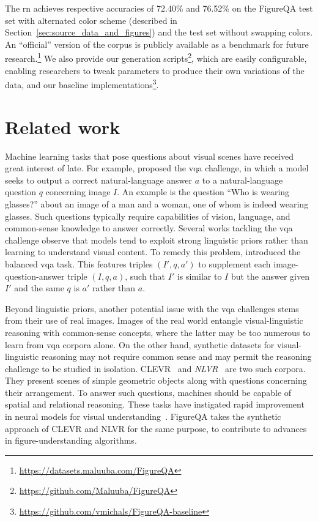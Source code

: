 \documentclass{article} \usepackage{iclr2018_workshop,times}
\def\bestrntestone{76.52} \def\bestrntesttwo{72.40} \def\bestcnntesttwo{56.00} \def\bestvggtesttwo{52.47} \def\besttexttesttwo{50.01} \def\besthumantesttwohuman{91.21} \def\bestcnntesttwohuman{56.04} \def\bestrntesttwohuman{72.18} \def\bestrnonevalone{67.95} \def\bestrnonevaltwo{60.60} \def\bestrnonetestone{67.74} \def\bestrnonetesttwo{60.35}
\begin{document}
The \gls{rn} achieves respective accuracies of \bestrntesttwo\% and \bestrntestone\% on the FigureQA test set with alternated color scheme (described in Section~\ref{sec:source_data_and_figures}) and the test set without swapping colors.
An ``official'' version of the corpus is publicly available as a benchmark for future research.\footnote{\url{https://datasets.maluuba.com/FigureQA}} 
We also provide our generation scripts\footnote{\url{https://github.com/Maluuba/FigureQA}}, which are easily configurable, enabling researchers to tweak parameters to produce their own variations of the data, and our baseline implementations\footnote{\url{https://github.com/vmichals/FigureQA-baseline}}.

\section{Related work}
\label{sec:related}
Machine learning tasks that pose questions about visual scenes have received great interest of late.
For example, \citet{antol2015vqa} proposed the \gls{vqa} challenge, in which a model seeks to output a correct natural-language answer $a$ to a natural-language question $q$ concerning image $I$.
An example is the question ``Who is wearing glasses?'' about an image of a man and a woman, one of whom is indeed wearing glasses.
Such questions typically require capabilities of vision, language, and common-sense knowledge to answer correctly.
Several works tackling the \gls{vqa} challenge observe
that models tend to exploit strong linguistic priors rather than learning
to understand visual content. To remedy this problem, \citet{goyal2016making} 
introduced the balanced \gls{vqa} task. This features
triples  $(I', q, a')$ to supplement each image-question-answer triple $(I, q, a)$, 
such that $I'$ is similar to $I$ but the answer given $I'$ and the 
same $q$ is $a'$ rather than $a$.

Beyond linguistic priors, another potential issue with the \gls{vqa} challenges stems from their use of real images.
Images of the real world entangle visual-linguistic reasoning with common-sense concepts,
where the latter may be too numerous to learn from \gls{vqa} corpora alone.
On the other hand, synthetic datasets for visual-linguistic reasoning may not require common sense and may permit the reasoning challenge to be studied in isolation.
CLEVR~\citep{johnson2016clevr} and \emph{NLVR}~\citep{suhr2017corpus} are two such corpora.
They present scenes of simple geometric objects along with questions concerning their arrangement. To answer such questions, machines should be capable of spatial and relational reasoning.
These tasks have instigated rapid improvement in neural models for visual understanding~\citep{santoro2017simple,perez2017learning,hu2017learning}.
FigureQA takes the synthetic approach of CLEVR and NLVR for the same purpose, to contribute to advances in figure-understanding algorithms.
\end{document}
